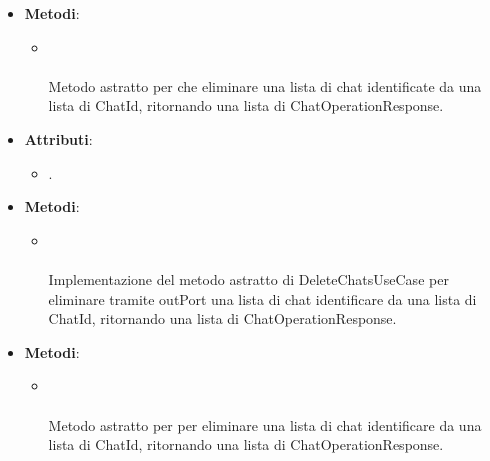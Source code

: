 \documentclass[10pt, a4paper]{article}
\begin{document}
\label{DeleteChatsUseCaseDettaglio}
\begin{itemize}
    \item \textbf{Metodi}:
    \begin{itemize}
        \item {}\\ \\
        Metodo astratto per che eliminare una lista di chat identificate da una lista di ChatId, ritornando una lista di ChatOperationResponse.
    \end{itemize}
\end{itemize}

\label{DeleteChatsServiceDettaglio}
\begin{itemize}
    \item \textbf{Attributi}:
    \begin{itemize}
        \item {}.
    \end{itemize}
    \item \textbf{Metodi}:
    \begin{itemize}
        \item {}\\ \\
        Implementazione del metodo astratto di DeleteChatsUseCase per eliminare tramite outPort una lista di chat identificare da una lista di ChatId, ritornando una lista di ChatOperationResponse.
    \end{itemize}
\end{itemize}

\label{DeleteChatsPortDettaglio}
\begin{itemize}
    \item \textbf{Metodi}:
    \begin{itemize}
        \item {}\\ \\
        Metodo astratto per per eliminare una lista di chat identificare da una lista di ChatId, ritornando una lista di ChatOperationResponse.
    \end{itemize}
\end{itemize}
\end{document}

